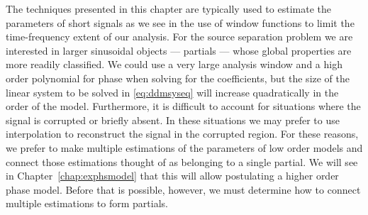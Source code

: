 The techniques presented in this chapter are typically used to estimate the
parameters of short signals as we see in the use of window functions to limit
the time-frequency extent of our analysis. For the source separation problem we
are interested in larger sinusoidal objects --- partials --- whose global
properties are more readily classified. We could use a very large
analysis window and a high order polynomial for phase when solving for the
coefficients, but the size of the linear system to be solved in
\ref{eq:ddmsyseq} will increase quadratically in the order of the model.
Furthermore, it is difficult to account for situations where the signal is
corrupted or briefly absent. In these situations we may prefer to use
interpolation to reconstruct the signal in the corrupted region. For these
reasons, we prefer to make multiple estimations of the parameters of low order
models and connect those estimations thought of as belonging to a single
partial. We will see in Chapter~\ref{chap:exphsmodel} that this will allow
postulating a higher order phase model. Before that is possible, however, we
must determine how to connect multiple estimations to form partials.
